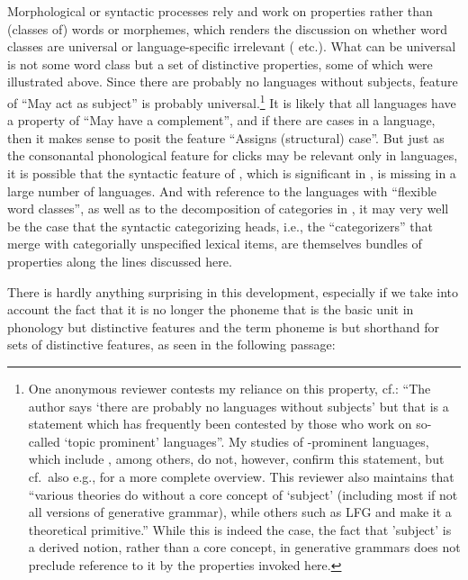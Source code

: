\documentclass[output=paper]{langsci/langscibook}
\begin{document}
Morphological or syntactic processes rely and work on properties rather than
(classes of) words or morphemes, which renders the discussion on whether word
classes are universal or language-specific irrelevant
(\citealt{Hengeveld1992,Croft2005,Haspelmath2012} etc.). What can be universal
is not some word class but a set of distinctive properties, some of which were
illustrated above. Since there are probably no languages without subjects,
 feature of \enquote{May act as subject} is probably
universal.\footnote{One anonymous reviewer contests my reliance on this
    property, cf.: \enquote{The author says ‘there are probably no languages
        without subjects’ but that is a statement which has frequently been
    contested by those who work on so-called ‘topic prominent’ languages}. My
    studies of -prominent languages, which include , among
    others, do not, however, confirm this statement, but cf.\ also e.g.,
    \citet{EKiss2002} for a more complete overview. This reviewer also
    maintains that \enquote{various theories do without a core concept of
        \enquote{subject} (including most if not all versions of generative
        grammar), while others such as \gls{LFG}
        and  make it a
theoretical primitive.} While this is indeed the case, the fact that ’subject’
is a derived notion, rather than a core concept, in generative grammars does
not preclude reference to it by the properties invoked here.} It is likely that
all languages have a property of \enquote{May have a complement}, and if there
are cases in a language, then it makes sense to posit the feature
\enquote{Assigns (structural) case}. But just as the consonantal phonological
feature for clicks may be relevant only in  languages, it is possible that
the syntactic feature of , which is significant in
, is
missing in a large number of languages. And with reference to the languages
with \enquote{flexible word classes}, as well as to the decomposition of
categories in , it may very
well be the case that the syntactic categorizing heads, i.e., the
\enquote{categorizers} that merge with categorially unspecified lexical items,
are themselves bundles of properties along the lines discussed here.

There is hardly anything surprising in this development, especially if we take
into account the fact that it is no longer the phoneme that is the basic unit
in phonology but distinctive features and the term phoneme is but shorthand for
sets of distinctive features, as seen in the following passage:
\end{document}
